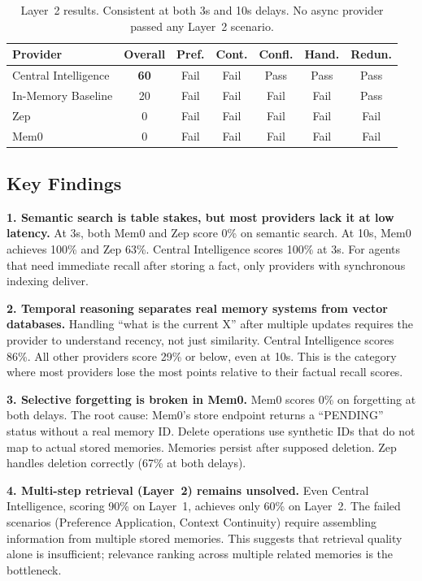 \documentclass[11pt]{article}
\begin{document}
\begin{table}[h]
\centering
\begin{tabular}{lcccccc}
\toprule
\textbf{Provider} & \textbf{Overall} & \textbf{Pref.} & \textbf{Cont.} & \textbf{Confl.} & \textbf{Hand.} & \textbf{Redun.} \\
\midrule
Central Intelligence & \textbf{60} & Fail & Fail & Pass & Pass & Pass \\
In-Memory Baseline & 20 & Fail & Fail & Fail & Fail & Pass \\
Zep & 0 & Fail & Fail & Fail & Fail & Fail \\
Mem0 & 0 & Fail & Fail & Fail & Fail & Fail \\
\bottomrule
\end{tabular}
\caption{Layer~2 results. Consistent at both 3s and 10s delays. No async provider passed any Layer~2 scenario.}
\label{tab:layer2results}
\end{table}

\subsection{Key Findings}

\textbf{1. Semantic search is table stakes, but most providers lack it at low latency.} At 3s, both Mem0 and Zep score 0\% on semantic search. At 10s, Mem0 achieves 100\% and Zep 63\%. Central Intelligence scores 100\% at 3s. For agents that need immediate recall after storing a fact, only providers with synchronous indexing deliver.

\textbf{2. Temporal reasoning separates real memory systems from vector databases.} Handling ``what is the current X'' after multiple updates requires the provider to understand recency, not just similarity. Central Intelligence scores 86\%. All other providers score 29\% or below, even at 10s. This is the category where most providers lose the most points relative to their factual recall scores.

\textbf{3. Selective forgetting is broken in Mem0.} Mem0 scores 0\% on forgetting at both delays. The root cause: Mem0's store endpoint returns a ``PENDING'' status without a real memory ID. Delete operations use synthetic IDs that do not map to actual stored memories. Memories persist after supposed deletion. Zep handles deletion correctly (67\% at both delays).

\textbf{4. Multi-step retrieval (Layer~2) remains unsolved.} Even Central Intelligence, scoring 90\% on Layer~1, achieves only 60\% on Layer~2. The failed scenarios (Preference Application, Context Continuity) require assembling information from multiple stored memories. This suggests that retrieval quality alone is insufficient; relevance ranking across multiple related memories is the bottleneck.
\end{document}
